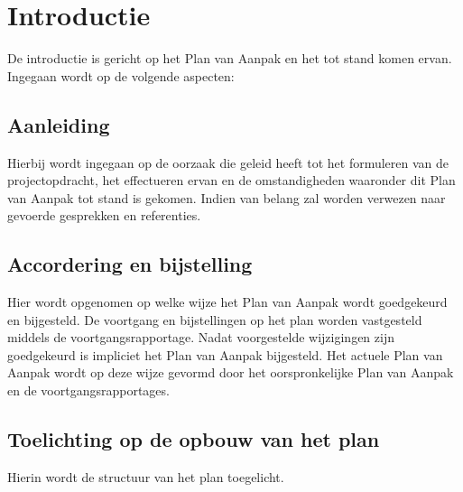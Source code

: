 \section{Introductie}

De introductie is gericht op het Plan van Aanpak en het tot stand komen ervan.
Ingegaan wordt op de volgende aspecten:

\subsection{Aanleiding}
Hierbij wordt ingegaan op de oorzaak die geleid heeft tot het formuleren van de projectopdracht,
het effectueren ervan en de omstandigheden waaronder dit Plan van Aanpak tot stand is gekomen.
Indien van belang zal worden verwezen naar gevoerde gesprekken en referenties.

\subsection{Accordering en bijstelling}
Hier wordt opgenomen op welke wijze het Plan van Aanpak wordt goedgekeurd en bijgesteld.
De voortgang en bijstellingen op het plan worden vastgesteld middels de voortgangsrapportage.
Nadat voorgestelde wijzigingen zijn goedgekeurd is impliciet het Plan van Aanpak bijgesteld.
Het actuele Plan van Aanpak wordt op deze wijze gevormd door het oorspronkelijke Plan van Aanpak en de voortgangsrapportages.

\subsection{Toelichting op de opbouw van het plan}
Hierin wordt de structuur van het plan toegelicht.

